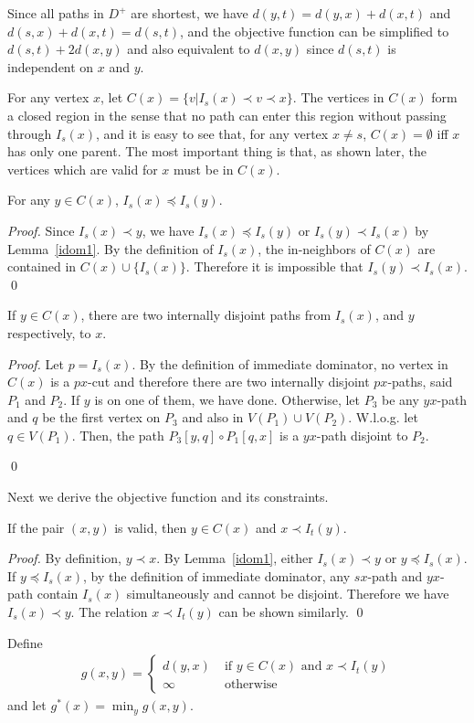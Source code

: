 Since all paths in $D^+$ are shortest, we have $d(y,t)=d(y,x)+d(x,t)$ and $d(s,x)+d(x,t)=d(s,t)$, and the objective function can be simplified to $d(s,t)+2d(x,y)$ and also equivalent to $d(x,y)$ since $d(s,t)$ is independent on $x$ and $y$.

For any vertex $x$, let $C(x)=\{v| I_s(x)\prec v\prec x\}$.
The vertices in $C(x)$ form a closed region in the sense that no path can enter this region without passing through $I_s(x)$, and it is easy to see that, for any vertex $x\neq s$, $C(x)=\emptyset$ iff $x$ has only one parent.
The most important thing is that, as shown later, the vertices which are valid for $x$ must be in $C(x)$. 
\begin{lemma}\label{hier}
For any $y\in C(x)$, $I_s(x)\preceq I_s(y)$.
\end{lemma}
\begin{proof}
Since $I_s(x)\prec y$, we have $I_s(x)\preceq I_s(y)$ or $I_s(y)\prec I_s(x)$ by Lemma~\ref{idom1}.
By the definition of $I_s(x)$, the in-neighbors of $C(x)$ are contained in $C(x)\cup \{I_s(x)\}$.
Therefore it is impossible that $I_s(y)\prec I_s(x)$.
\qed\end{proof}

\begin{lemma}\label{close}
If $y\in C(x)$, there are two internally disjoint paths from $I_s(x)$, and $y$ respectively, to $x$. 
\end{lemma}
\begin{proof}
Let $p=I_s(x)$.
By the definition of immediate dominator, no vertex in $C(x)$ is a $px$-cut and therefore there are two internally disjoint $px$-paths, said $P_1$ and $P_2$.
If $y$ is on one of them, we have done.
Otherwise, let $P_3$ be any $yx$-path and $q$ be the first vertex on $P_3$ and also in $V(P_1)\cup V(P_2)$.
W.l.o.g. let $q\in V(P_1)$. 
Then, the path $P_3[y,q]\circ P_1[q,x]$ is a $yx$-path disjoint to $P_2$.

\qed\end{proof}

Next we derive the objective function and its constraints.
\begin{lemma}\label{cand}
If the pair $(x,y)$ is valid, then $y\in C(x)$ and $x\prec I_t(y)$.
\end{lemma}
\begin{proof}
By definition, $y\prec x$. By Lemma~\ref{idom1}, either $I_s(x)\prec y$ or $y\preceq I_s(x)$. 
If $y\preceq I_s(x)$, by the definition of immediate dominator, any $sx$-path and $yx$-path contain $I_s(x)$ simultaneously and cannot be disjoint.
Therefore we have $I_s(x)\prec y$.
The relation $x\prec I_t(y)$ can be shown similarly.
\qed\end{proof}
Define 
\begin{eqnarray}
g(x,y)=\left\{\begin{array}{ll}
d(y,x)\;&\mbox{if }y\in C(x)\mbox{ and }x\prec I_t(y) \\
\infty&\mbox{otherwise}
\end{array}\right. \label{obj}
\end{eqnarray}
and let $g^*(x)=\min_y g(x,y)$.

